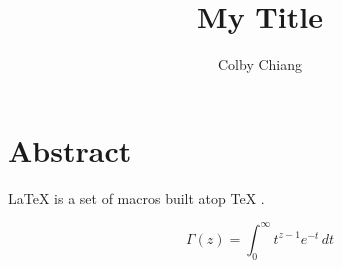 \documentclass[a4paper,10pt]{article}
\title{My Title}
\author{Colby Chiang}
\begin{document}
\maketitle

\section{Abstract}
\LaTeX{} \citep{latex2e} is a set of macros built atop
\TeX{} \citep{texbook}.

\lipsum[1]

\begin{equation}
    \Gamma(z) = \int_0^\infty t^{z-1} e^{-t}\,dt
\end{equation}

\lipsum[2]


\end{document}
